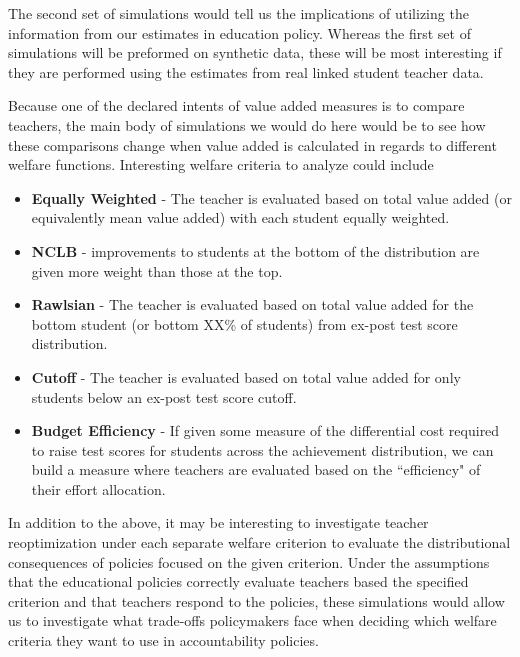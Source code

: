 \documentclass[letterpaper,12pt]{article}
\begin{document}
The second set of simulations would tell us the implications of utilizing the information from our estimates in education policy. Whereas the first set of simulations will be preformed on synthetic data, these will be most interesting if they are performed using the estimates from real linked student teacher data.

Because one of the declared intents of value added measures is to compare teachers, the main body of simulations we would do here would be to see how these comparisons change when value added is calculated in regards to different welfare functions. Interesting welfare criteria to analyze could include

\begin{itemize}
    \item \textbf{Equally Weighted} - The teacher is evaluated based on total value added (or equivalently mean value added) with each student equally weighted.
    \item \textbf{NCLB} - improvements to students at the bottom of the distribution are given more weight than those at the top. 
    \item \textbf{Rawlsian} - The teacher is evaluated based on total value added for the bottom student (or bottom XX\% of students) from ex-post test score distribution. 
    \item \textbf{Cutoff} - The teacher is evaluated based on total value added for only students below an ex-post test score cutoff.
    \item \textbf{Budget Efficiency} - If given some measure of the differential cost required to raise test scores for students across the achievement distribution, we can build a measure where teachers are evaluated based on the ``efficiency" of their effort allocation.
\end{itemize}

In addition to the above, it may be interesting to investigate teacher reoptimization under each separate welfare criterion to evaluate the distributional consequences of policies focused on the given criterion. Under the assumptions that the educational policies correctly evaluate teachers based the specified criterion and that teachers respond to the policies, these simulations would allow us to investigate what trade-offs policymakers face when deciding which welfare criteria they want to use in accountability policies.


\end{document}
